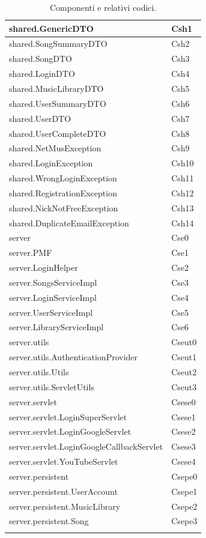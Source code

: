 \begin{footnotesize}
\begin{longtable}[!h]{|l|l|}
shared.GenericDTO & Csh1\\\hline
shared.SongSummaryDTO & Csh2\\\hline
shared.SongDTO & Csh3\\\hline
shared.LoginDTO & Csh4\\\hline
shared.MusicLibraryDTO & Csh5\\\hline
shared.UserSummaryDTO & Csh6\\\hline
shared.UserDTO & Csh7\\\hline
shared.UserCompleteDTO & Csh8\\\hline
shared.NetMusException & Csh9\\\hline
shared.LoginException & Csh10\\\hline
shared.WrongLoginException & Csh11\\\hline
shared.RegistrationException & Csh12\\\hline
shared.NickNotFreeException & Csh13\\\hline
shared.DuplicateEmailException & Csh14\\\hline
server & Cse0\\\hline
server.PMF & Cse1\\\hline
server.LoginHelper & Cse2\\\hline
server.SongsServiceImpl & Cse3\\\hline
server.LoginServiceImpl & Cse4\\\hline
server.UserServiceImpl & Cse5\\\hline
server.LibraryServiceImpl & Cse6\\\hline
server.utils & Cseut0\\\hline
server.utils.AuthenticationProvider & Cseut1\\\hline
server.utils.Utils & Cseut2\\\hline
server.utils.ServletUtils & Cseut3\\\hline
server.servlet & Csese0\\\hline
server.servlet.LoginSuperServlet & Csese1\\\hline
server.servlet.LoginGoogleServlet & Csese2\\\hline
server.servlet.LoginGoogleCallbackServlet & Csese3\\\hline
server.servlet.YouTubeServlet & Csese4\\\hline
server.persistent & Csepe0\\\hline
server.persistent.UserAccount & Csepe1\\\hline
server.persistent.MusicLibrary & Csepe2\\\hline
server.persistent.Song & Csepe3\\\hline
\caption{Componenti e relativi codici.}
\end{longtable}
\end{footnotesize}

